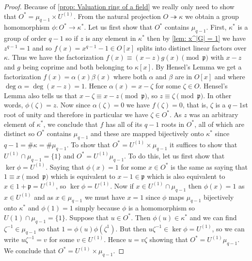 \documentclass{article}
\newcommand{\mfrak}[1]{\mathfrak{#1}}
\begin{document}
\begin{proof}
    Because of \cref{prop: Valuation ring of a field} we really only need to show that $O^* = \mu_{q-1} \times U^{(1)}$. From the natural projection $O \twoheadrightarrow \kappa$ we obtain a group homomorphism $\phi : O^* \to \kappa^*$. Let us first show that $O^*$ contains $\mu_{q-1}$. First, $\kappa^*$ is a group of order $q-1$ so if $z$ is any element in $\kappa^*$ then by \cref{lem: x^|G| = 1} we have $z^{q-1} = 1$ and so $f(x) = x^{q-1} - 1 \in O[x]$ splits into distinct linear factors over $\kappa$. Thus we have the factorization $f(x) \equiv (x-z) g(x) \pmod {\mfrak p}$ with $x - z$ and $g$ being coprime and both belonging to $\kappa[x]$. By Hensel's Lemma we get a factorization $f(x) = \alpha(x)\beta(x)$ where both $\alpha$ and $\beta$ are in $O[x]$ and where $\deg \alpha = \deg (x - z) = 1$. Hence $\alpha(x) = x - \zeta$ for some $\zeta \in O$. Hensel's Lemma also tells us that $x - \zeta \equiv x - z \pmod {\mfrak p}$, so $z \equiv \zeta \pmod{\mfrak p}$. In other words, $\phi(\zeta) = z$. Now since $\alpha(\zeta) = 0$ we have $f(\zeta) = 0$, that is, $\zeta$ is a $q-1$st root of unity and therefore in particular we have $\zeta \in O^*$. As $z$ was an arbitrary element of $\kappa^*$, we conclude that $f$ has all of its $q-1$ roots in $O^*$, all of which are distinct so $O^*$ contains $\mu_{q-1}$ and these are mapped bijectively onto $\kappa^*$ since $q- 1 = \# \kappa = \# \mu_{q-1}$. To show that $O^* = U^{(1)} \times \mu_{q-1}$ it suffices to show that $U^{(1)}\cap \mu_{q-1} = \{1\}$ and  $O^* = U^{(1)}\mu_{q-1}$. To do this, let us first show that $\ker \phi = U^{(1)}$. Saying that $\phi(x) = 1$ for some $x \in O^*$ is the same as saying that $1 \equiv x \pmod{\mfrak p}$ which is equivalent to $x - 1 \in \mfrak p$ which is also equivalent to $x \in 1 + \mfrak p = U^{(1)}$, so $\ker \phi = U^{(1)}$. Now if $x \in U^{(1)} \cap \mu_{q-1}$ then $\phi(x) = 1$ as $x \in U^{(1)}$ and as $x \in \mu_{q-1}$ we must have $x = 1$ since $\phi$ maps $\mu_{q-1}$ bijectively onto $\kappa^*$ and $\phi(1) = 1$ simply because $\phi$ is a homomorphism so $U{(1)} \cap \mu_{q-1} = \{ 1 \}$. Suppose that $u \in O^*$. Then $\phi(u) \in \kappa^*$ and we can find $\zeta^{-1} \in \mu_{q-1}$ so that $1 = \phi(u)\phi(\zeta^{1})$. But then $u\zeta^{-1} \in \ker \phi = U^{(1)}$, so we can write $u\zeta^{-1} = v$ for some $v \in U^{(1)}$. Hence $u = v \zeta$ showing that $O^* = U^{(1)}\mu_{q-1}$. We conclude that $O^* = U^{(1)} \times \mu_{q-1}$.
\end{proof}
\end{document}
